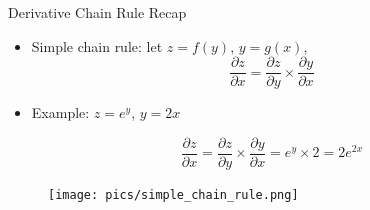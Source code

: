 \documentclass[handout]{beamer}
\begin{document}
\begin{frame}{Derivative Chain Rule Recap}
\begin{scriptsize}


\begin{itemize}
\item Simple chain rule: let $z = f(y)$, $y = g(x)$, 
\begin{displaymath}
\frac{\partial z}{\partial x} = \frac{\partial z}{\partial y} \times \frac{\partial y}{\partial x}
\end{displaymath}

\item  Example: $z= e^{y}$, $y = 2x$ 

\begin{displaymath}
\frac{\partial z}{\partial x} = \frac{\partial z}{\partial y} \times \frac{\partial y}{\partial x} = e^{y} \times 2 = 2 e^{2x}
\end{displaymath}


\end{itemize}


\begin{figure}[htb]
	\centering
	 \texttt{[image: pics/simple\_chain\_rule.png]}
\end{figure}


\end{scriptsize}
\end{frame}
\end{document}
